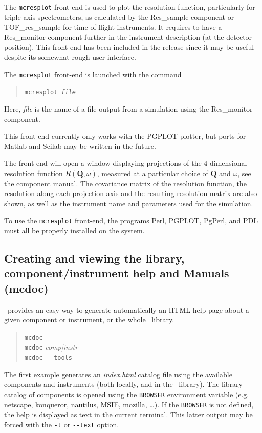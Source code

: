 The \verb+mcresplot+ front-end is used to plot the resolution function, particularly for triple-axis
spectrometers, as
calculated by the Res\_sample component or TOF\_res\_sample for
time-of-flight instruments. It requires to have a Res\_monitor component further in the instrument description (at the detector position).
This front-end
has been included in the release since it may be useful
despite its somewhat rough user interface.

The \verb+mcresplot+ front-end is launched with the command
\begin{quote}
  \texttt{mcresplot {\it file\/}}
\end{quote}
Here, {\it file\/} is the name of a file output from a simulation using
the Res\_monitor component.

This front-end currently only works with the PGPLOT plotter, but ports for Matlab and Scilab may be written in the future.

The front-end will open a window displaying projections of the 4-dimensional
resolution function $R(\boldsymbol{Q}, \omega)$, measured at a
particular choice of $\boldsymbol{Q}$ and $\omega$, see the component
manual. The covariance matrix of the
resolution function, the resolution along each projection axis and the resulting
resolution matrix are also shown, as well as the instrument name and parameters
used for the simulation.

To use the \verb+mcresplot+ front-end, the programs Perl, PGPLOT, PgPerl,
and PDL must all be properly installed on the system.

\subsection{Creating and viewing the library, component/instrument help and Manuals (mcdoc)}
\label{s:mcdoc-run}

\MCS\ provides an easy way to generate automatically an HTML help page about a given component or instrument, or the whole \MCS\ library. 
\begin{quote}
  \verb|mcdoc|\\
  \verb|mcdoc| {\it comp|instr}\\
  \verb|mcdoc --tools|
\end{quote}
The first example generates an {\it index.html} catalog file using the available components and instruments (both locally, and in the \MCS\ library). The library catalog of components is opened using the \verb+BROWSER+ environment variable  (e.g. netscape, konqueror, nautilus, MSIE, mozilla, \ldots). If the \verb+BROWSER+ is not defined, the help is displayed as text in the current terminal. This latter output may be forced with the \verb+-t+ or \verb+--text+ option.

